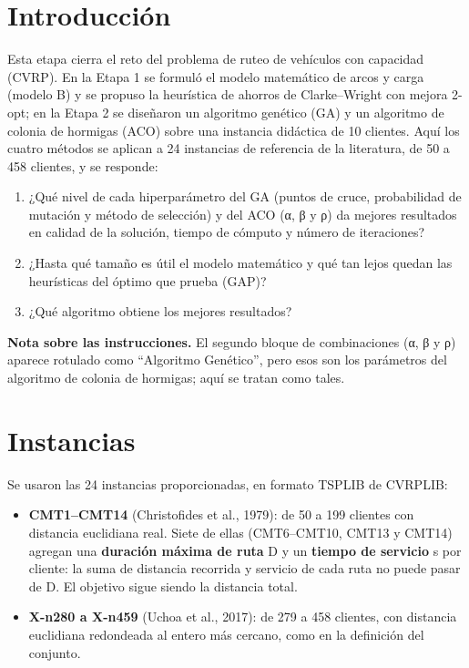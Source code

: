\documentclass[11pt,letterpaper]{article}
\providecommand{\tightlist}{\setlength{\itemsep}{0pt}\setlength{\parskip}{0pt}}
\begin{document}
\tableofcontents
\newpage

\hypertarget{introducciuxf3n}{%
\section{Introducción}\label{introducciuxf3n}}

Esta etapa cierra el reto del problema de ruteo de vehículos con capacidad (CVRP). En la Etapa 1 se formuló el modelo matemático de arcos y carga (modelo B) y se propuso la heurística de ahorros de Clarke--Wright con mejora 2-opt; en la Etapa 2 se diseñaron un algoritmo genético (GA) y un algoritmo de colonia de hormigas (ACO) sobre una instancia didáctica de 10 clientes. Aquí los cuatro métodos se aplican a 24 instancias de referencia de la literatura, de 50 a 458 clientes, y se responde:

\begin{enumerate}
\def\labelenumi{\arabic{enumi}.}
\tightlist
\item
  ¿Qué nivel de cada hiperparámetro del GA (puntos de cruce, probabilidad de mutación y método de selección) y del ACO (α, β y ρ) da mejores resultados en calidad de la solución, tiempo de cómputo y número de iteraciones?
\item
  ¿Hasta qué tamaño es útil el modelo matemático y qué tan lejos quedan las heurísticas del óptimo que prueba (GAP)?
\item
  ¿Qué algoritmo obtiene los mejores resultados?
\end{enumerate}

\textbf{Nota sobre las instrucciones.} El segundo bloque de combinaciones (α, β y ρ) aparece rotulado como ``Algoritmo Genético'', pero esos son los parámetros del algoritmo de colonia de hormigas; aquí se tratan como tales.

\hypertarget{instancias}{%
\section{Instancias}\label{instancias}}

Se usaron las 24 instancias proporcionadas, en formato TSPLIB de CVRPLIB:

\begin{itemize}
\tightlist
\item
  \textbf{CMT1--CMT14} (Christofides et al., 1979): de 50 a 199 clientes con distancia euclidiana real. Siete de ellas (CMT6--CMT10, CMT13 y CMT14) agregan una \textbf{duración máxima de ruta} D y un \textbf{tiempo de servicio} s por cliente: la suma de distancia recorrida y servicio de cada ruta no puede pasar de D. El objetivo sigue siendo la distancia total.
\item
  \textbf{X-n280 a X-n459} (Uchoa et al., 2017): de 279 a 458 clientes, con distancia euclidiana redondeada al entero más cercano, como en la definición del conjunto.
\end{itemize}
\end{document}
